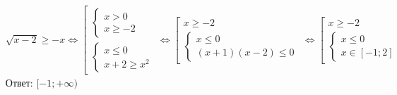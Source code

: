 \begin{example}
    \begin{align*}
        &\sqrt{x - 2} \ge -x \iff
        \left[
            \begin{array}{l}
                \left\{\begin{array}{l}
                    x > 0 \\
                    x \ge -2
                \end{array}\right. \\
                \left\{\begin{array}{l}
                    x \le 0 \\
                    x + 2 \ge x^2
                \end{array}\right.
            \end{array}
        \right. \iff
        \left[
            \begin{array}{l}
                x \ge -2 \\
                \left\{\begin{array}{l}
                    x \le 0 \\
                    (x + 1)(x - 2) \le 0
                \end{array}\right.
            \end{array}
        \right. \iff
        \left[
            \begin{array}{l}
                x \ge -2 \\
                \left\{\begin{array}{l}
                    x \le 0 \\
                    x \in [-1; 2]
                \end{array}\right.
            \end{array}
        \right. \\
        &\text{Ответ: } [-1; +\infty)
    \end{align*}
\end{example}
